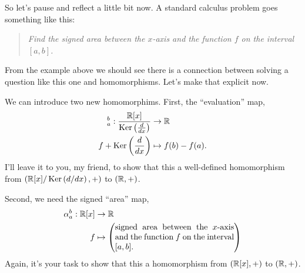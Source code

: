 \documentclass{ximera}
\begin{document}
So let's pause and reflect a little bit now. A standard calculus
problem goes something like this:

\begin{quote}
  \textit{Find the signed area between the $x$-axis and the function
    $f$ on the interval $[a,b]$.}
\end{quote}

From the example above we should see there is a connection between
solving a question like this one and homomorphisms. Let's make that
explicit now.

We can introduce two new homomorphims. First, the ``evaluation'' map,
  \begin{align*}
    [-]_a^b: \frac{\R[x]}{\ker\left(\frac{d}{dx}\right)}&\to\R\\
    f+ \ker\left(\frac{d}{dx}\right) &\mapsto f(b)-f(a).
  \end{align*}
I'll leave it to you, my friend, to show that this a well-defined
homomorphism from $(\mathbb R[x]/\mathop{\mathrm{Ker}}\nolimits\left(d/dx\right),+)$ to $(\mathbb R,+)$.


Second, we need the signed ``area'' map,
  \begin{align*}
    \alpha_a^b :\R[x]&\to \R\\
    f &\mapsto \left(\begin{minipage}{2in}signed area between the $x$-axis and the function $f$ on
    the interval $[a,b]$.\end{minipage}\right)
  \end{align*}
Again, it's your task to show that this a homomorphism from
$(\mathbb R[x],+)$ to $(\mathbb R,+)$.
\end{document}
